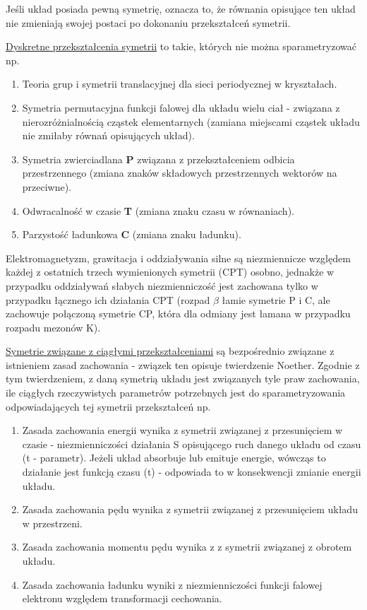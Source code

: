 Jeśli układ posiada pewną symetrię, oznacza to, że równania opisujące ten układ nie zmieniają swojej postaci po dokonaniu przekształceń symetrii.

\underline{Dyskretne przekształcenia symetrii} to takie, których nie można sparametryzować np.
\begin{enumerate}[-]
	
\item Teoria grup i symetrii translacyjnej dla sieci periodycznej w kryształach.
\item Symetria permutacyjna funkcji falowej dla układu wielu ciał - związana z nierozróżnialnością cząstek elementarnych (zamiana miejscami cząstek układu nie zmiłaby równań opisujących układ).
\item Symetria zwierciadlana \textbf{P} związana z przekształceniem odbicia przestrzennego (zmiana znaków składowych przestrzennych wektorów na przeciwne).
\item Odwracalność w czasie \textbf{T} (zmiana znaku czasu w równaniach).
\item Parzystość ładunkowa \textbf{C} (zmiana znaku ładunku).

\end{enumerate}

Elektromagnetyzm, grawitacja i oddziaływania silne są niezmiennicze względem każdej z ostatnich trzech wymienionych symetrii (CPT) osobno, jednakże w przypadku oddziaływań słabych niezmienniczość jest zachowana tylko w przypadku łącznego ich działania CPT (rozpad $ \beta $ łamie symetrie P i C, ale zachowuje połączoną symetrie CP, która dla odmiany jest łamana w przypadku rozpadu mezonów K).

\underline{Symetrie związane z ciągłymi przekształceniami} są bezpośrednio związane z istnieniem zasad zachowania - związek ten opisuje twierdzenie Noether. Zgodnie z tym twierdzeniem, z daną symetrią układu jest związanych tyle praw zachowania, ile ciągłych rzeczywistych parametrów potrzebnych jest do sparametryzowania odpowiadających tej symetrii przekształceń np.

\begin{enumerate}[-]
\item Zasada zachowania energii wynika z symetrii związanej z przesunięciem w czasie - niezmienniczości działania S opisującego ruch danego układu od czasu (t - parametr). Jeżeli układ absorbuje lub emituje energie, wówcząs to działanie jest funkcją czasu (t) - odpowiada to w konsekwencji zmianie energii układu.

\item Zasada zachowania pędu wynika z symetrii związanej z przesunięciem układu w przestrzeni.

\item Zasada zachowania momentu pędu wynika z z symetrii związanej z obrotem układu.

\item Zasada zachowania ładunku wyniki z niezmienniczości funkcji falowej elektronu względem transformacji cechowania.
\end{enumerate}